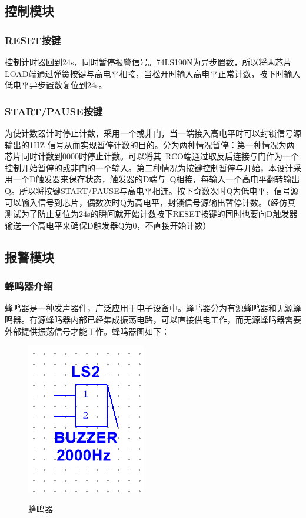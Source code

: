 \documentclass[12p,UTF8]{article}
\begin{document}
\begin{spacing}{1.25}
  \subsection{控制模块}
  \subsubsection{RESET按键}
  控制计时器回到24s，同时暂停报警信号。74LS190N为异步置数，所以将两芯片LOAD端通过弹簧按键与高电平相接，当松开时输入高电平正常计数，按下时输入低电平异步置数复位到24s。
  \subsubsection{START/PAUSE按键}
  为使计数器计时停止计数，采用一个或非门，当一端接入高电平时可以封锁信号源输出的1HZ	信号从而实现暂停计数的目的。分为两种情况暂停：第一种情况为两芯片同时计数到0000时停止计数。可以将其~RCO端通过取反后连接与门作为一个控制开始暂停的或非门的一个输入。第二种情况为按键控制暂停与开始，本设计采用一个D触发器来保存状态，触发器的D端与~Q相接，每输入一个高电平翻转输出Q。所以将按键START/PAUSE与高电平相连。按下奇数次时Q为低电平，信号源可以输入信号到芯片，偶数次时Q为高电平，封锁信号源输出暂停计数。（经仿真测试为了防止复位为24s的瞬间就开始计数按下RESET按键的同时也要向D触发器输送一个高电平来确保D触发器Q为0，不直接开始计数）

  \subsection{报警模块}
  \subsubsection{蜂鸣器介绍}
  蜂鸣器是一种发声器件，广泛应用于电子设备中。蜂鸣器分为有源蜂鸣器和无源蜂鸣器。有源蜂鸣器内部已经集成振荡电路，可以直接供电工作，而无源蜂鸣器需要外部提供振荡信号才能工作。蜂鸣器图如下：
  \begin{figure}[H]
    \centering  %
    \label{蜂鸣器}
    \includegraphics[width=0.35\linewidth]{buzzer.png}
    \caption{蜂鸣器}
    \label{蜂鸣器}
  \end{figure}

\end{spacing}
\end{document}
